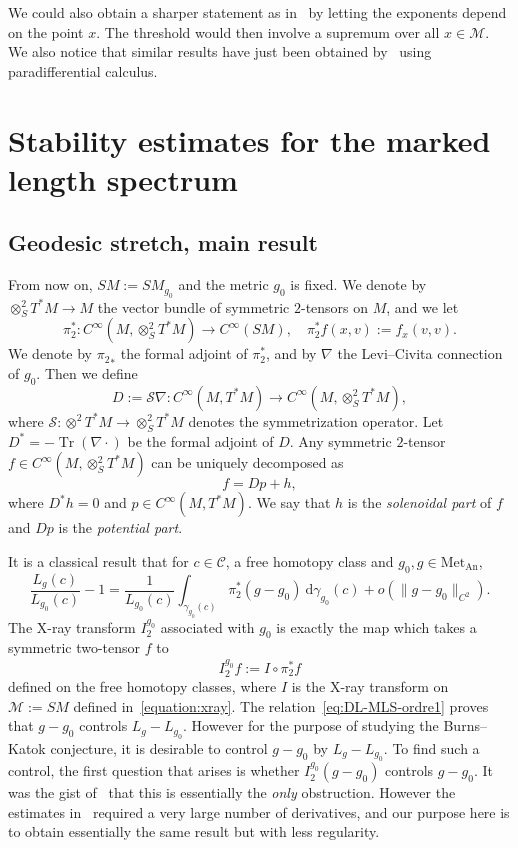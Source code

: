 \documentclass[10pt]{amsart}
\theoremstyle{definition}\newtheorem{defi}[theo]{Definition}\newtheorem{rema}[theo]{Remark}\newtheorem{exam}[theo]{Example}\newtheorem{exem}[theo]{Example}\newtheorem{nota}[theo]{Notation}
\newcommand{\mc}{\mathcal}
\newcommand{\M}{\mathcal{M}}
\newcommand{\clS}{\mathcal{S}}
\newcommand{\dd}{\mathrm{d}}
\newcommand{\Met}{\mathrm{Met}}
\newcommand{\An}{\mathrm{An}}
\DeclareMathOperator{\Tr}{Tr}
\begin{document}
We could also obtain a sharper statement as in~\cite{Hasselblatt-92} by letting the exponents depend on the point $x$. The threshold would then involve a supremum over all $x \in \M$. We also notice that similar results have just been obtained by~\cite{Guillarmou-Poyferre-21} using paradifferential calculus.



\section{Stability estimates for the marked length spectrum}\label{section:mls}

\subsection{Geodesic stretch, main result}

From now on, $SM := SM_{g_0}$ and the metric $g_0$ is fixed. We denote by $\otimes^2_S T^*M \rightarrow M$ the vector bundle of symmetric $2$-tensors on $M$, and we let
\[
\pi_2^* : C^\infty\left(M,\otimes^2_S T^*M\right) \rightarrow C^\infty(SM),\quad\pi_2^* f(x,v) := f_x(v,v).
\]
We denote by ${\pi_2}_*$ the formal adjoint of $\pi_2^\ast$, and by $\nabla$ the Levi--Civita connection of $g_0$. Then we define
\[
D := \clS \nabla : C^\infty\left(M,T^*M\right) \rightarrow C^\infty\left(M,\otimes^2_S T^*M\right),
\]
where $\mc{S} : \otimes^2 T^*M \rightarrow \otimes^2_S T^*M$ denotes the symmetrization operator. Let $D^* = -\Tr(\nabla \cdot)$ be the formal adjoint of $D$. Any symmetric $2$-tensor $f \in C^\infty(M,\otimes^2_S T^*M)$ can be uniquely decomposed as
\[
f = Dp + h,
\]
where $D^*h = 0$ and $p \in C^\infty(M,T^*M)$. We say that $h$ is the \emph{solenoidal part} of $f$ and $Dp$ is the \emph{potential part}.


It is a classical result that for $c \in \mc{C}$, a free homotopy class and $g_0, g\in \Met_{\An}$,
\begin{equation}\label{eq:DL-MLS-ordre1}
\frac{L_g(c)}{L_{g_0}(c)} - 1 = \frac{1}{L_{g_0}(c)} \int_{\gamma_{g_0}(c)} \pi_2^\ast(g-g_0)~\dd \gamma_{g_0}(c) + o\left(\| g - g_0 \|_{C^2}\right).
\end{equation}
The X-ray transform $I_2^{g_0}$ associated with $g_0$ is exactly the map which takes a symmetric two-tensor $f$ to
\[
I_2^{g_0}f := I \circ \pi_2^* f
\]
defined on the free homotopy classes, where $I$ is the X-ray transform on $\M := SM$ defined in~\eqref{equation:xray}. The relation~\eqref{eq:DL-MLS-ordre1} proves that $g-g_0$ controls $L_g- L_{g_0}$. However for the purpose of studying the Burns--Katok conjecture, it is desirable to control $g-g_0$ by $L_g-L_{g_0}$. To find such a control, the first question that arises is whether $I^{g_0}_2 (g-g_0)$ controls $g-g_0$. It was the gist of~\cite{Guillarmou-Lefeuvre-18} that this is essentially the \emph{only} obstruction. However the estimates in~\cite{Guillarmou-Lefeuvre-18} required a very large number of derivatives, and our purpose here is to obtain essentially the same result but with less regularity.
\end{document}
